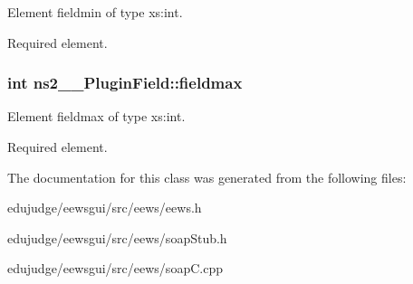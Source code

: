 Element fieldmin of type xs:int. 

Required element. 
\subsubsection{\setlength{\rightskip}{0pt plus 5cm}int {\bf ns2\_\-\_\-PluginField::fieldmax}}\label{classns2____PluginField_2f98e6dfed25308a8fd592836a2ffe40}


Element fieldmax of type xs:int. 

Required element. 

The documentation for this class was generated from the following files:\begin{CompactItemize}
\item 
edujudge/eewsgui/src/eews/eews.h\item 
edujudge/eewsgui/src/eews/soapStub.h\item 
edujudge/eewsgui/src/eews/soapC.cpp\end{CompactItemize}
